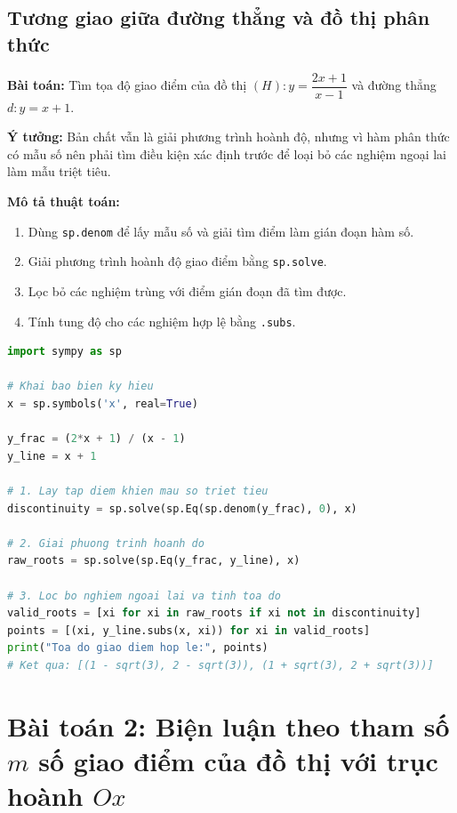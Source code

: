 \subsection{Tương giao giữa đường thẳng và đồ thị phân thức}

\textbf{Bài toán:} Tìm tọa độ giao điểm của đồ thị $(H): y = \dfrac{2x + 1}{x - 1}$ và đường thẳng $d: y = x + 1$.

\noindent\textbf{Ý tưởng:} Bản chất vẫn là giải phương trình hoành độ, nhưng vì hàm phân thức có mẫu số nên phải tìm điều kiện xác định trước để loại bỏ các nghiệm ngoại lai làm mẫu triệt tiêu.

\noindent\textbf{Mô tả thuật toán:}
\begin{enumerate}
    \item Dùng \texttt{sp.denom} để lấy mẫu số và giải tìm điểm làm gián đoạn hàm số.
    \item Giải phương trình hoành độ giao điểm bằng \texttt{sp.solve}.
    \item Lọc bỏ các nghiệm trùng với điểm gián đoạn đã tìm được.
    \item Tính tung độ cho các nghiệm hợp lệ bằng \texttt{.subs}.
\end{enumerate}

\begin{lstlisting}[language=Python, caption={Tương giao hàm phân thức và loại nghiệm gián đoạn}]
import sympy as sp

# Khai bao bien ky hieu
x = sp.symbols('x', real=True)

y_frac = (2*x + 1) / (x - 1)
y_line = x + 1

# 1. Lay tap diem khien mau so triet tieu
discontinuity = sp.solve(sp.Eq(sp.denom(y_frac), 0), x)

# 2. Giai phuong trinh hoanh do
raw_roots = sp.solve(sp.Eq(y_frac, y_line), x)

# 3. Loc bo nghiem ngoai lai va tinh toa do
valid_roots = [xi for xi in raw_roots if xi not in discontinuity]
points = [(xi, y_line.subs(x, xi)) for xi in valid_roots]
print("Toa do giao diem hop le:", points)
# Ket qua: [(1 - sqrt(3), 2 - sqrt(3)), (1 + sqrt(3), 2 + sqrt(3))]
\end{lstlisting}

\section{Bài toán 2: Biện luận theo tham số $m$ số giao điểm của đồ thị với trục hoành $Ox$}

